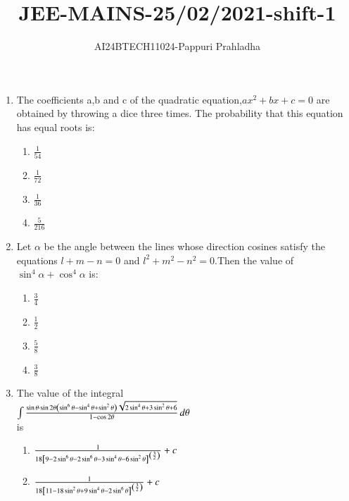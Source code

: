 \documentclass[journal]{IEEEtran}
\begin{document}

\vspace{3cm}

\title{JEE-MAINS-25/02/2021-shift-1}
\author{AI24BTECH11024-Pappuri Prahladha}
{\let\newpage\relax\maketitle}

\renewcommand{\thefigure}{\theenumi}
\renewcommand{\thetable}{\theenumi}
\setlength{\intextsep}{10pt} %


\renewcommand{\thetable}{\theenumi}
\begin{enumerate}
\item The coefficients a,b and c of the quadratic equation,$ax^{2}+bx+c=0$ are obtained by throwing a dice three times. The probability that this equation has equal roots is$\colon$
\begin{enumerate}
    \item $\frac{1}{54}$
    \item $\frac{1}{72}$
    \item $\frac{1}{36}$
    \item $\frac{5}{216}$
\end{enumerate}
\item Let $\alpha$ be the angle between the lines whose direction cosines satisfy the equations $l+m-n=0$ and $l^{2}+m^{2}-n^{2}=0$.Then the value of $\sin^{4}\alpha+\cos^{4}\alpha$ is$\colon$
\begin{enumerate}
    \item $\frac{3}{4}$
    \item $\frac{1}{2}$
    \item $\frac{5}{8}$
    \item $\frac{3}{8}$
\end{enumerate}
\item The value of the integral\\
$\int \frac{\sin \theta \cdot \sin 2\theta \left( \sin^{6} \theta - \sin^{4} \theta + \sin^{2} \theta \right) \sqrt{2 \sin^{4} \theta + 3 \sin^{2} \theta + 6}}{1 - \cos 2\theta} \, d\theta$\\is
\begin{enumerate}
    \item $\frac{1}{18{}\left[9-2\sin^{6}\theta-2\sin^{6}\theta-3\sin^{4}\theta-6\sin^{2}\theta\right]^{\left(\frac{3}{2}\right)}}+c$
    \item $\frac{1}{18{}\left[11-18\sin^{2}\theta+9\sin^{4}\theta-2\sin^{6}\theta\right]^{\left(\frac{3}{2}\right)}}+c$

\end{enumerate}
\end{enumerate}
\end{document}
